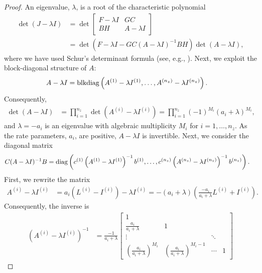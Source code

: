 \begin{proof}
	An eigenvalue, $\lambda$, is a root of the characteristic polynomial
	\begin{align}\label{eq:lct:stability:proof:determinant}
		\det(J - \lambda I)
		&=
		\det
		\begin{bmatrix}
			F - \lambda I & GC \\
			BH & A - \lambda I
		\end{bmatrix} \\
		&=
		\det\left(F - \lambda I - GC (A - \lambda I)^{-1} BH\right) \det(A - \lambda I), \nonumber
	\end{align}
	where we have used Schur's determinant formula (see, e.g., \cite{Zhang:2005}). Next, we exploit the block-diagonal structure of $A$:
	\begin{align}
		A - \lambda I &= \operatorname{blkdiag}\left(A^{(1)} - \lambda I^{(1)}, \ldots, A^{(n_z)} - \lambda I^{(n_z)}\right).
	\end{align}
	Consequently,
	\begin{align}
		\det(A - \lambda I) &= \prod_{i=1}^{n_z} \det (A^{(i)} - \lambda I^{(i)}) = \prod_{i=1}^{n_z} (-1)^{M_i} (a_i + \lambda)^{M_i},
	\end{align}
	and $\lambda = -a_i$ is an eigenvalue with algebraic multiplicity $M_i$ for $i = 1, \ldots, n_z$. As the rate parameters, $a_i$, are positive, $A - \lambda I$ is invertible. Next, we consider the diagonal matrix
	\begin{align}\label{eq:lct:stability:proof:camliinvb}
		C (A - \lambda I)^{-1} B &= \operatorname{diag}\left(c^{(1)} \left(A^{(1)} - \lambda I^{(1)}\right)^{-1} b^{(1)}, \ldots, c^{(n_z)} \left(A^{(n_z)} - \lambda I^{(n_z)}\right)^{-1} b^{(n_z)}\right).
	\end{align}
	First, we rewrite the matrix
	\begin{align}
		A^{(i)} - \lambda I^{(i)} &= a_i \left(L^{(i)} - I^{(i)}\right) - \lambda I^{(i)} = -(a_i + \lambda)\left(\frac{-a_i}{a_i + \lambda} L^{(i)} + I^{(i)}\right).
	\end{align}
	Consequently, the inverse is
	\begin{align}
		\left(A^{(i)} - \lambda I^{(i)}\right)^{-1} &= \frac{-1}{a_i + \lambda}
		\begin{bmatrix}
			1 \\
			\frac{a_i}{a_i + \lambda} & 1 \\
			\vdots & & \ddots \\
			\left(\frac{a_i}{a_i + \lambda}\right)^{M_i} & \left(\frac{a_i}{a_i + \lambda}\right)^{M_i-1} & \cdots & 1

\end{bmatrix}
\end{align}
\end{proof}
